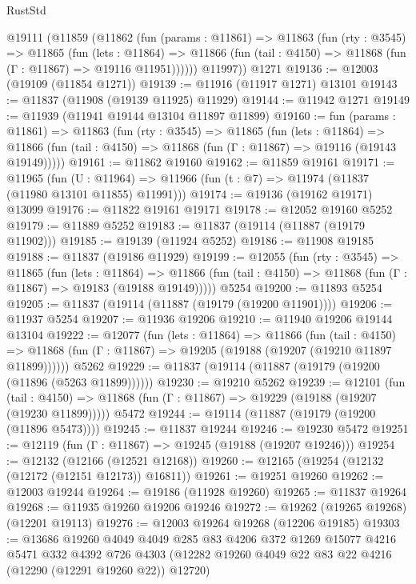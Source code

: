\begin{lexlean}{RustStd}
\begin{coremodule}
{\begin{coremodule}
{{{{{{{{{{{{{{{{{{{{{{{{{{{{{{{{{{{{{{{{{{{{{{{{{{    @19111
      (@11859
        (@11862
          (fun (params : @11861) =>
          @11863
            (fun (rty : @3545) =>
            @11865
              (fun (lets : @11864) =>
              @11866 (fun (tail : @4150) => @11868 (fun (Γ : @11867) => @19116 @11951))))))
        @11997))
    @1271
@19136 := @12003 (@19109 (@11854 @1271))
@19139 := @11916 (@11917 @1271) @13101
@19143 := @11837 (@11908 (@19139 @11925) @11929)
@19144 := @11942 @1271
@19149 := @11939 (@11941 @19144 @13104 @11897 @11899)
@19160 := fun (params : @11861) =>
  @11863
    (fun (rty : @3545) =>
    @11865
      (fun (lets : @11864) =>
      @11866 (fun (tail : @4150) => @11868 (fun (Γ : @11867) => @19116 (@19143 @19149)))))
@19161 := @11862 @19160
@19162 := @11859 @19161
@19171 := @11965
    (fun (U : @11964) => @11966 (fun (t : @7) => @11974 (@11837 (@11980 @13101 @11855) @11991)))
@19174 := @19136 (@19162 @19171) @13099
@19176 := @11822 @19161 @19171
@19178 := @12052 @19160 @5252
@19179 := @11889 @5252
@19183 := @11837 (@19114 (@11887 (@19179 @11902)))
@19185 := @19139 (@11924 @5252)
@19186 := @11908 @19185
@19188 := @11837 (@19186 @11929)
@19199 := @12055
    (fun (rty : @3545) =>
    @11865
      (fun (lets : @11864) =>
      @11866 (fun (tail : @4150) => @11868 (fun (Γ : @11867) => @19183 (@19188 @19149)))))
    @5254
@19200 := @11893 @5254
@19205 := @11837 (@19114 (@11887 (@19179 (@19200 @11901))))
@19206 := @11937 @5254
@19207 := @11936 @19206
@19210 := @11940 @19206 @19144 @13104
@19222 := @12077
    (fun (lets : @11864) =>
    @11866
      (fun (tail : @4150) =>
      @11868 (fun (Γ : @11867) => @19205 (@19188 (@19207 (@19210 @11897 @11899))))))
    @5262
@19229 := @11837 (@19114 (@11887 (@19179 (@19200 (@11896 (@5263 @11899))))))
@19230 := @19210 @5262
@19239 := @12101
    (fun (tail : @4150) => @11868 (fun (Γ : @11867) => @19229 (@19188 (@19207 (@19230 @11899)))))
    @5472
@19244 := @19114 (@11887 (@19179 (@19200 (@11896 @5473))))
@19245 := @11837 @19244
@19246 := @19230 @5472
@19251 := @12119 (fun (Γ : @11867) => @19245 (@19188 (@19207 @19246)))
@19254 := @12132 (@12166 (@12521 @12168))
@19260 := @12165 (@19254 (@12132 (@12172 (@12151 @12173)) @16811))
@19261 := @19251 @19260
@19262 := @12003 @19244
@19264 := @19186 (@11928 @19260)
@19265 := @11837 @19264
@19268 := @11935 @19260 @19206 @19246
@19272 := @19262 (@19265 @19268) (@12201 @19113)
@19276 := @12003 @19264 @19268 (@12206 @19185)
@19303 := @13686
    @19260
    @4049
    @4049
    @285
    @83
    @4206
    @372
    @1269
    @15077
    @4216
    @5471
    @332
    @4392
    @726
    @4303
    (@12282 @19260 @4049 @22 @83 @22 @4216 (@12290 (@12291 @19260 @22)) @12720)
}}}}}}}}}}}}}}}}}}}}}}}}}}}}}}}}}}}}}}}}}}}}}}}}}}
\end{coremodule}}
\end{coremodule}
\end{lexlean}
